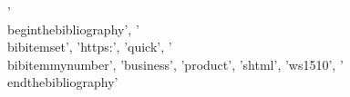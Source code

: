 {'\\begin{thebibliography}', '\\bibitem{set}', 'https:', 'quick', '\\bibitem{mynumber}', 'business', 'product', 'shtml', 'ws1510', '\\end{thebibliography}'}
